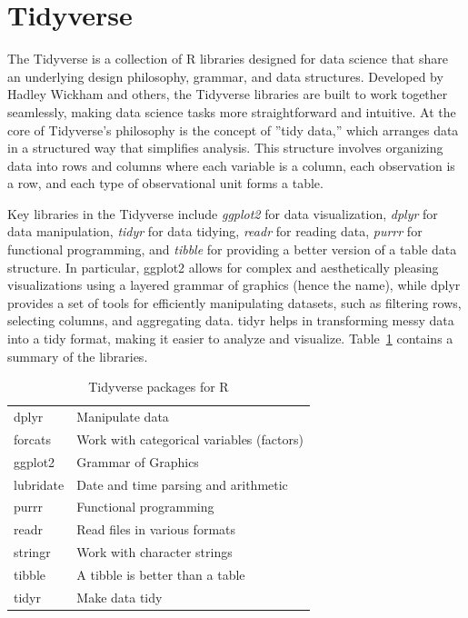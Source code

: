\section{Tidyverse}

The Tidyverse is a collection of R libraries designed for data science that share an underlying design philosophy, grammar, and data structures. Developed by Hadley Wickham and others, the Tidyverse libraries are built to work together seamlessly, making data science tasks more straightforward and intuitive. At the core of Tidyverse's philosophy is the concept of ''tidy data,'' which arranges data in a structured way that simplifies analysis. This structure involves organizing data into rows and columns where each variable is a column, each observation is a row, and each type of observational unit forms a table.

Key libraries in the Tidyverse include \emph{ggplot2} for data visualization, \emph{dplyr} for data manipulation, \emph{tidyr} for data tidying, \emph{readr} for reading data, \emph{purrr} for functional programming, and \emph{tibble} for providing a better version of a table data structure. In particular, ggplot2 allows for complex and aesthetically pleasing visualizations using a layered grammar of graphics (hence the name), while dplyr provides a set of tools for efficiently manipulating datasets, such as filtering rows, selecting columns, and aggregating data. tidyr helps in transforming messy data into a tidy format, making it easier to analyze and visualize. Table~\ref{tab:tidyverse} contains a summary of the libraries.

\begin{table}
\centering

\renewcommand{\arraystretch}{1.25}
\begin{tabular}{l|l} \hline
dplyr & Manipulate data \\
forcats & Work with categorical variables (factors) \\
ggplot2 & Grammar of Graphics \\
lubridate & Date and time parsing and arithmetic \\
purrr & Functional programming \\
readr & Read files in various formats \\
stringr & Work with character strings \\
tibble & A tibble is better than a table \\
tidyr & Make data tidy \\ \hline
\end{tabular}
\caption{Tidyverse packages for R}
\label{tab:tidyverse}
\end{table}

